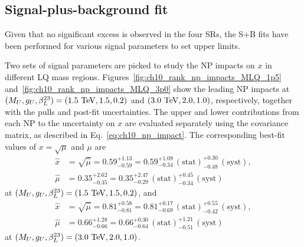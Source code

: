 \clearpage
\subsection{Signal-plus-background fit}
\label{subsec:ch10_sbfit}
Given that no significant excess is observed in the four SRs, the S+B fits have been performed for various signal parameters to set upper limits.

Two sets of signal parameters are picked to study the NP impacts on $x$ in different LQ mass regions.
Figures~\ref{fig:ch10_rank_np_impacts_MLQ_1p5} and~\ref{fig:ch10_rank_np_impacts_MLQ_3p0} show the leading NP impacts at $(M_U,g_U,\beta_L^{23})=(1.5~\mathrm{TeV},1.5,0.2)$ and $(3.0~\mathrm{TeV},2.0,1.0)$, respectively, together with the pulls and post-fit uncertainties.
The upper and lower contributions from each NP to the uncertainty on $x$ are evaluated separately using the covariance matrix, as described in Eq.~\eqref{eq:ch10_np_impact}.
The corresponding best-fit values of $x=\sqrt{\mu}$ and $\mu$ are
\begin{align*}
 \hat{x}&=\sqrt{\hat\mu}
 =0.59^{+1.13}_{-0.59}
 =0.59^{+1.09}_{-0.34}\,\mathrm{(stat)}
       ^{+0.30}_{-0.48}\,\mathrm{(syst)},\\
 \hat\mu&=0.35^{+2.62}_{-0.35}
 =0.35^{+2.47}_{-0.29}\,\mathrm{(stat)}
       ^{+0.45}_{-0.34}\,\mathrm{(syst)}
\end{align*}
at $(M_U,g_U,\beta_L^{23})=(1.5~\mathrm{TeV},1.5,0.2)$, and
\begin{align*}
 \hat{x}&=\sqrt{\hat\mu}
 =0.81^{+0.58}_{-0.81}
 =0.81^{+0.17}_{-0.69}\,\mathrm{(stat)}
       ^{+0.55}_{-0.42}\,\mathrm{(syst)},\\
 \hat\mu&=0.66^{+1.28}_{-0.66}
 =0.66^{+0.30}_{-0.64}\,\mathrm{(stat)}
       ^{+1.21}_{-0.51}\,\mathrm{(syst)}
\end{align*}
at $(M_U,g_U,\beta_L^{23})=(3.0~\mathrm{TeV},2.0,1.0)$.

